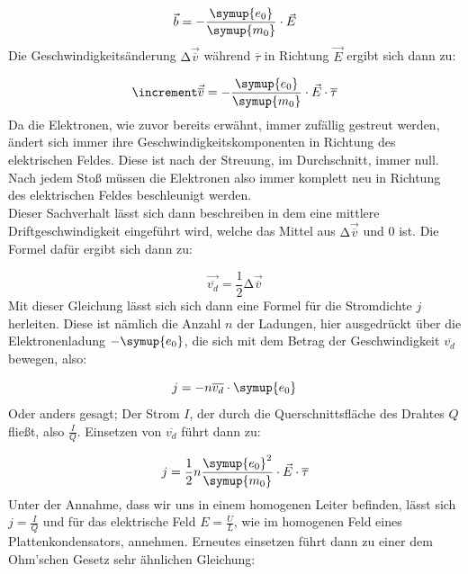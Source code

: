 \begin{equation}
  \vec{b} = -\frac{\symup{e_0}}{\symup{m_0}} \cdot \vec{E} \nonumber
\end{equation}
\noindent
Die Geschwindigkeitsänderung $\increment\vec{\overline{v}}$ während $\overline{\tau}$ in Richtung $\vec{E}$ ergibt sich dann zu:

\begin{equation}
  \increment\vec{\overline{v}}= -\frac{\symup{e_0}}{\symup{m_0}}\cdot \vec{E} \cdot \overline{\tau} 
  \label{eqn:v1}
\end{equation}
\noindent
Da die Elektronen, wie zuvor bereits erwähnt, immer zufällig gestreut werden, ändert sich immer ihre Geschwindigkeitskomponenten in Richtung
des elektrischen Feldes. Diese ist nach der Streuung, im Durchschnitt, immer null.
Nach jedem Stoß müssen die Elektronen also immer komplett neu in Richtung des elektrischen Feldes beschleunigt werden.\\
Dieser Sachverhalt lässt sich dann beschreiben in dem eine mittlere Driftgeschwindigkeit eingeführt wird, welche das Mittel aus $\increment\vec{\overline{v}}$ 
und 0 ist. Die Formel dafür ergibt sich dann zu:

\begin{equation}
  \vec{\overline{v_d}}=\frac{1}{2}\increment\vec{\overline{v}} 
  \label{eqn:v1}
\end{equation}
\noindent
Mit dieser Gleichung lässt sich sich dann eine Formel für die Stromdichte $j$ herleiten. Diese ist nämlich die Anzahl $n$ der Ladungen, hier ausgedrückt
über die Elektronenladung $-\symup{e_0}$, die sich mit dem Betrag der Geschwindigkeit $\overline{v_d}$ bewegen, also:

\begin{equation}
  j=-n\overline{v_d}\cdot \symup{e_0} 
  \label{eqn:j1}
\end{equation}
\noindent
Oder anders gesagt; Der Strom $I$, der durch die Querschnittsfläche des Drahtes $Q$ fließt, also $\frac{I}{Q}$.
Einsetzen von $\overline{v_d}$  führt dann zu:

\begin{equation}
  j=\frac{1}{2}n\frac{\symup{e_0}^2}{\symup{m_0}}\cdot \vec{E} \cdot \overline{\tau} \nonumber
\end{equation}
\noindent
Unter der Annahme, dass wir uns in einem homogenen Leiter befinden, lässt sich $j=\frac{I}{Q}$ und für das elektrische Feld $E=\frac{U}{L}$, wie im homogenen Feld eines Plattenkondensators, annehmen.
Erneutes einsetzen führt dann zu einer dem Ohm'schen Gesetz sehr ähnlichen Gleichung:

